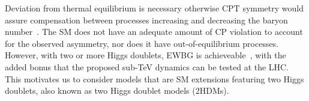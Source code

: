 Deviation from thermal equilibrium is necessary otherwise CPT symmetry would assure compensation between processes increasing and decreasing the baryon number~\cite{ShaposhnikovFarrar1993BAU}.
The SM does not have an adequate amount of CP violation to account for the observed asymmetry, nor does it have out-of-equilibrium processes.
However, with two or more Higgs doublets, EWBG is achieveable~\cite{Kuzmin1985EWBG}, with the added bonus that the proposed sub-TeV dynamics can be tested at the LHC.
This motivates us to consider models that are SM extensions featuring two Higgs doublets, also known as two Higgs doublet models (2HDMs).